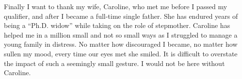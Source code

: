 Finally I want to thank my wife, Caroline, who met me before I passed my qualifier, and after I became a full-time single father. She has endured years of being a ``Ph.D. widow'' while taking on the role of stepmother. Caroline has helped me in a million small and not so small ways as I struggled to manage a young family in distress. No matter how discouraged I became, no matter how sullen my mood, every time our eyes met she smiled. It is difficult to overstate the impact of such a seemingly small gesture. I would not be here without Caroline.

\clearpage
